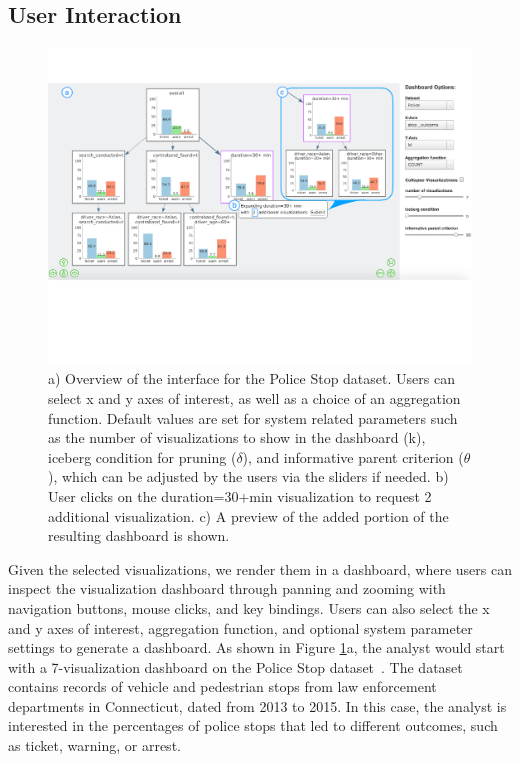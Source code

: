 \subsection{User Interaction\label{sec:interaction}}
\begin{figure}[ht!]
\centering
\includegraphics[width=0.95\linewidth,frame]{figures/overview_interface_expand.pdf}
\caption{a) Overview of the \system interface for the Police Stop dataset. Users can select x and y axes of interest, as well as a choice of an aggregation function. Default values are set for system related parameters such as the number of visualizations to show in the dashboard (k), iceberg condition for pruning ($\delta$), and informative parent criterion ($\theta$), which can be adjusted by the users via the sliders if needed. b) User clicks on the duration=30+min visualization to request 2 additional visualization. c) A preview of the added portion of the resulting dashboard is shown.}
\label{fig:overview}
\vspace{-10pt}
\end{figure}
\par Given the selected visualizations, we render them in a dashboard, where users can inspect the visualization dashboard through panning and zooming with navigation buttons, mouse clicks, and key bindings. Users can also select the x and y axes of interest, aggregation function, and optional system parameter settings to generate a dashboard. As shown in Figure \ref{fig:overview}a, the analyst would start with a 7-visualization dashboard on the Police Stop dataset~\cite{police}. The dataset contains records of vehicle and pedestrian stops from law enforcement departments in Connecticut, dated from 2013 to 2015. In this case, the analyst is interested in the percentages of police stops that led to different outcomes, such as ticket, warning, or arrest. 
